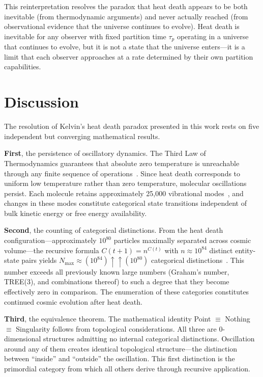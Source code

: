 \documentclass[12pt,a4paper]{article}
\theoremstyle{definition}
\theoremstyle{remark}
\newcommand{\Nmax}{N_{\text{max}}}
\begin{document}
This reinterpretation resolves the paradox that heat death appears to be both inevitable (from thermodynamic arguments) and never actually reached (from observational evidence that the universe continues to evolve). Heat death is inevitable for any observer with fixed partition time $\tau_p$ operating in a universe that continues to evolve, but it is not a state that the universe enters—it is a limit that each observer approaches at a rate determined by their own partition capabilities.


\section{Discussion}

The resolution of Kelvin's heat death paradox presented in this work rests on five independent but converging mathematical results.

\textbf{First}, the persistence of oscillatory dynamics. The Third Law of Thermodynamics guarantees that absolute zero temperature is unreachable through any finite sequence of operations~\citep{nernst1906waermetheorem}. Since heat death corresponds to uniform low temperature rather than zero temperature, molecular oscillations persist. Each molecule retains approximately 25,000 vibrational modes~\citep{herzberg1945infrared}, and changes in these modes constitute categorical state transitions independent of bulk kinetic energy or free energy availability.

\textbf{Second}, the counting of categorical distinctions. From the heat death configuration---approximately $10^{80}$ particles maximally separated across cosmic volume---the recursive formula $C(t+1) = n^{C(t)}$ with $n \approx 10^{84}$ distinct entity-state pairs yields $\Nmax \approx (10^{84}) \uparrow\uparrow (10^{80})$ categorical distinctions~\citep{sachikonye2024observation}. This number exceeds all previously known large numbers (Graham's number, TREE(3), and combinations thereof) to such a degree that they become effectively zero in comparison. The enumeration of these categories constitutes continued cosmic evolution after heat death.

\textbf{Third}, the equivalence theorem. The mathematical identity Point $\equiv$ Nothing $\equiv$ Singularity follows from topological considerations. All three are 0-dimensional structures admitting no internal categorical distinctions. Oscillation around any of them creates identical topological structure---the distinction between ``inside'' and ``outside'' the oscillation. This first distinction is the primordial category from which all others derive through recursive application.
\end{document}
